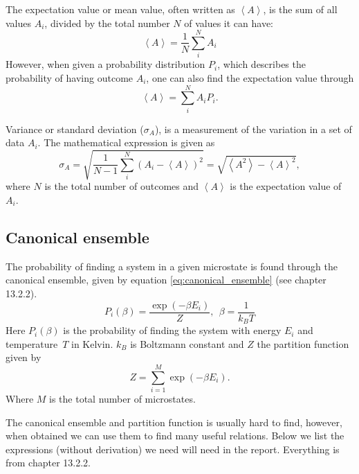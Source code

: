 \documentclass[reprint, english,notitlepage,nofootinbib]{revtex4-1}  %
\begin{document}
The expectation value or mean value, often written as $\left<A\right>$, is the sum of all values $A_i$, divided by the total number $N$ of values it can have:
\begin{equation*}
	\left< A \right> = \frac{1}{N}\sum_{i}^{N}A_i
\end{equation*}
However, when given a probability distribution $P_i$, which describes the probability of having outcome $A_i$, one can also find the expectation value through
\begin{equation*}
	\left<A\right> = \sum_{i}^{N}A_iP_i.
\end{equation*} 

Variance or standard deviation ($\sigma_A$), is a measurement of the variation in a set of data $A_i$. The mathematical expression is given as
\begin{equation*}
	\sigma_A = \sqrt{\frac{1}{N-1} \sum_{i}^{N} (A_i - \left<A\right>)^2} = \sqrt{\left<A^2\right> - \left<A\right>^2},
\end{equation*} 
where $N$ is the total number of outcomes and $\left<A\right>$ is the expectation value of $A_i$.

\subsection*{Canonical ensemble}
The probability of finding a system in a given microstate is found through the canonical ensemble, given by equation \eqref{eq:canonical_ensemble} (see \cite{lectures2015} chapter 13.2.2).
\begin{equation}
	\label{eq:canonical_ensemble}
	P_i(\beta) = \frac{\exp(-\beta E_i)}{Z},\ \ \beta = \frac{1}{k_BT}
\end{equation}
Here $P_i(\beta)$ is the probability of finding the system with energy $E_i$ and temperature $T$ in Kelvin. $k_B$ is Boltzmann constant and $Z$ the partition function given by
\begin{equation}
	\label{eq:partition_function}
	Z = \sum_{i = 1}^{M}\exp(-\beta E_i).
\end{equation}
Where $M$ is the total number of microstates.

The canonical ensemble and partition function is usually hard to find, however, when obtained we can use them to find many useful relations. Below we list the expressions (without derivation) we need will need in the report. Everything is from \cite{lectures2015} chapter 13.2.2.
\end{document}
